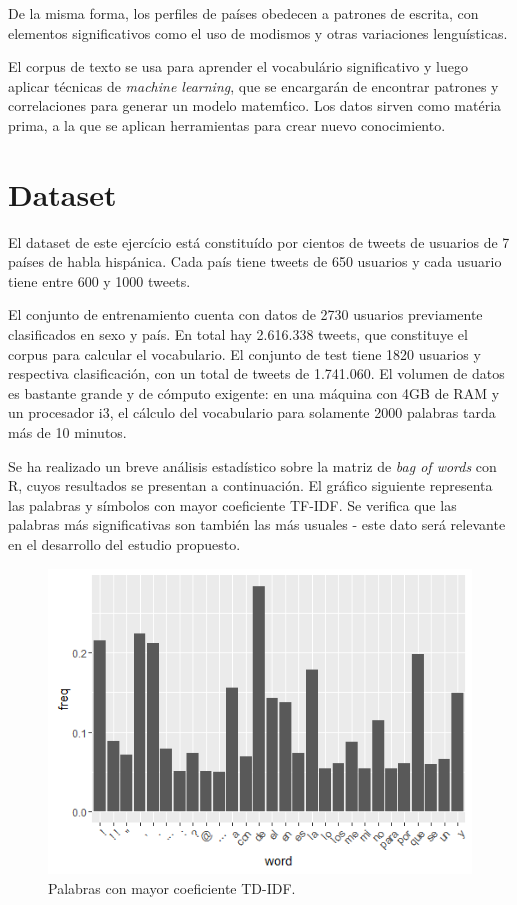 \documentclass[11pt,a4paper]{article}
\begin{document}
  De la misma forma, los perfiles de pa\'ises obedecen a patrones de escrita, con elementos significativos como el uso de modismos y otras variaciones lengu\'isticas. 

  El corpus de texto se usa para aprender el vocabul\'ario significativo y luego aplicar t\'ecnicas de {\em machine learning}, que se encargar\'an de encontrar patrones y correlaciones para generar un modelo matem\'tico. Los datos sirven como mat\'eria prima, a la que se aplican herramientas para crear nuevo conocimiento.


\section{Dataset}

  El dataset de este ejerc\'icio est\'a constitu\'ido por cientos de tweets de usuarios de 7 pa\'ises de habla hisp\'anica. Cada pa\'is tiene tweets de 650 usuarios y cada usuario tiene entre 600 y 1000 tweets. 

  El conjunto de entrenamiento cuenta con datos de 2730 usuarios previamente clasificados en sexo y pa\'is. En total hay 2.616.338 tweets, que constituye el corpus para calcular el vocabulario. El conjunto de test tiene 1820 usuarios y respectiva clasificaci\'on, con un total de tweets de 1.741.060. El volumen de datos es bastante grande y de c\'omputo exigente: en una m\'aquina con 4GB de RAM y un procesador i3, el c\'alculo del vocabulario para solamente 2000 palabras tarda m\'as de 10 minutos.

  Se ha realizado un breve an\'alisis estad\'istico sobre la matriz de {\em bag of words} con R, cuyos resultados se presentan a continuaci\'on. El gr\'afico siguiente representa las palabras y s\'imbolos con mayor coeficiente TF-IDF. Se verifica que las palabras m\'as significativas son tambi\'en las m\'as usuales - este dato ser\'a relevante en el desarrollo del estudio propuesto.
  
  \begin{figure}[ht!]
    \includegraphics[width=\linewidth]{most_used_words.png}
    \caption{Palabras con mayor coeficiente TD-IDF.}
    \label{fig:most_used_words}
  \end{figure}
    
\end{document}
